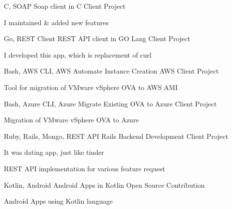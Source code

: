 \begin{cventries}
  \cventry
    {C, SOAP} %
    {Soap client in C} %
    {Client Project} %
    {} %
    {
      \begin{cvitems} %
        \item {I maintained \& added new features}
      \end{cvitems}
    }

  \cventry
    {Go, REST Client} %
    {REST API client in GO Lang} %
    {Client Project} %
    {} %
    {
      \begin{cvitems} %
        \item {I developed this app, which is replacement of curl}
      \end{cvitems}
    }
  
  \cventry
    {Bash, AWS CLI, AWS} %
    {Automate Instance Creation AWS} %
    {Client Project} %
    {} %
    {
      \begin{cvitems} %
        \item {Tool for migration of VMware vSphere OVA to AWS AMI}
      \end{cvitems}
    }

  \cventry
    {Bash, Azure CLI, Azure} %
    {Migrate Existing OVA to Azure} %
    {Client Project} %
    {} %
    {
      \begin{cvitems} %
        \item {Migration of VMware vSphere OVA to Azure}
      \end{cvitems}
    }

  \cventry
    {Ruby, Rails, Mongo, REST API} %
    {Rails Backend Development} %
    {Client Project} %
    {} %
    {
      \begin{cvitems} %
        \item {It was dating app, just like tinder}
        \item {REST API implementation for various feature request}
      \end{cvitems}
    }

  \cventry
    {Kotlin, Android} %
    {Android Apps in Kotlin} %
    {Open Source Contribution } %
    {} %
    {
      \begin{cvitems} %
        \item {Android Apps using Kotlin language}
      \end{cvitems}
    }





\end{cventries}
